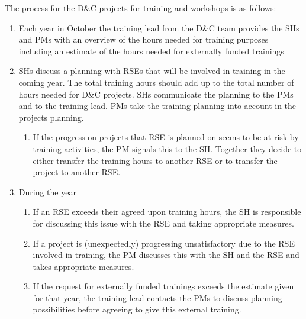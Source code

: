 The process for the D\&C projects for training and workshops is as follows:
\begin{enumerate}[label=\arabic*),ref=\arabic*]
\item Each year in October the training lead from the D\&C team provides the SHs and PMs with an
overview of the hours needed for training purposes including an estimate of the hours needed for externally funded trainings
\item SHs discuss a planning with RSEs that will be involved in training in the coming year. The
total training hours should add up to the total number of hours needed for D\&C projects. SHs communicate the planning
to the PMs and to the training lead. PMs take the training planning into account in the projects planning.
\begin{enumerate}[label=\alph*.,ref=\alph*]
\item If the progress on projects that RSE is planned on seems to be at risk by training activities,
the PM signals this to the SH. Together they decide to either transfer the training hours to another RSE or to transfer
the project to another RSE.
\end{enumerate}
\item During the year
\begin{enumerate}[label=\alph*.,ref=\alph*]
\item If an RSE exceeds their agreed upon training hours, the SH is responsible for discussing this
issue with the RSE and taking appropriate measures.
\item If a project is (unexpectedly) progressing unsatisfactory due to the RSE involved in training,
the PM discusses this with the SH and the RSE and takes appropriate measures.
\item If the request for externally funded trainings exceeds the estimate given for that year, the
training lead contacts the PMs to discuss planning possibilities before agreeing to give this external training.
\end{enumerate}
\end{enumerate}


